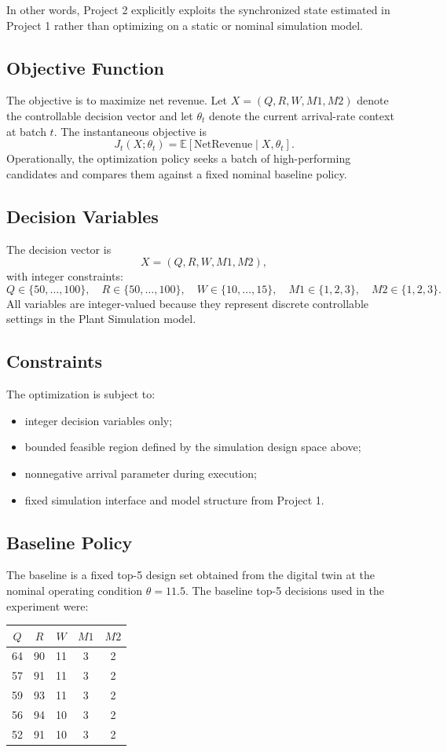 \documentclass[11pt]{article}
\begin{document}
In other words, Project 2 explicitly exploits the synchronized state estimated in Project 1 rather than optimizing on a static or nominal simulation model.

\subsection{Objective Function}
The objective is to maximize net revenue. Let $X=(Q,R,W,M1,M2)$ denote the controllable decision vector and let $\theta_t$ denote the current arrival-rate context at batch $t$. The instantaneous objective is
\[
J_t(X;\theta_t)=\mathbb{E}[\text{NetRevenue}\mid X,\theta_t].
\]
Operationally, the optimization policy seeks a batch of high-performing candidates and compares them against a fixed nominal baseline policy.

\subsection{Decision Variables}
The decision vector is
\[
X=(Q,R,W,M1,M2),
\]
with integer constraints:
\[
Q \in \{50,\dots,100\}, \quad
R \in \{50,\dots,100\}, \quad
W \in \{10,\dots,15\}, \quad
M1 \in \{1,2,3\}, \quad
M2 \in \{1,2,3\}.
\]
All variables are integer-valued because they represent discrete controllable settings in the Plant Simulation model.

\subsection{Constraints}
The optimization is subject to:
\begin{itemize}[leftmargin=1.5em]
    \item integer decision variables only;
    \item bounded feasible region defined by the simulation design space above;
    \item nonnegative arrival parameter during execution;
    \item fixed simulation interface and model structure from Project 1.
\end{itemize}

\subsection{Baseline Policy}
The baseline is a fixed top-5 design set obtained from the digital twin at the nominal operating condition $\theta = 11.5$. The baseline top-5 decisions used in the experiment were:
\begin{center}
\begin{tabular}{ccccc}
\toprule
$Q$ & $R$ & $W$ & $M1$ & $M2$ \\
\midrule
64 & 90 & 11 & 3 & 2 \\
57 & 91 & 11 & 3 & 2 \\
59 & 93 & 11 & 3 & 2 \\
56 & 94 & 10 & 3 & 2 \\
52 & 91 & 10 & 3 & 2 \\
\bottomrule
\end{tabular}
\end{center}
\end{document}
